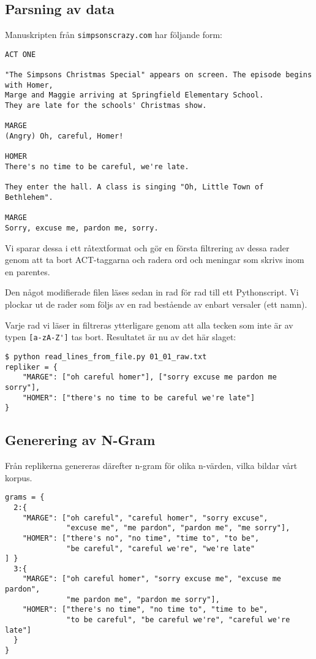\documentclass[a4paper]{article}
\begin{document}
\subsection{Parsning av data}
Manuskripten från \nolinkurl{simpsonscrazy.com} har följande form:
\begin{verbatim}
ACT ONE

"The Simpsons Christmas Special" appears on screen. The episode begins with Homer,
Marge and Maggie arriving at Springfield Elementary School.
They are late for the schools' Christmas show.

MARGE
(Angry) Oh, careful, Homer!

HOMER
There's no time to be careful, we're late.

They enter the hall. A class is singing "Oh, Little Town of Bethlehem".

MARGE
Sorry, excuse me, pardon me, sorry.
\end{verbatim}

Vi sparar dessa i ett råtextformat och gör en första filtrering av
dessa rader genom att ta bort ACT-taggarna och radera ord och meningar
som skrivs inom en parentes.

Den något modifierade filen läses sedan in rad för rad till ett
Pythonscript. Vi plockar ut de rader som följs av en rad bestående av
enbart versaler (ett namn).

Varje rad vi läser in filtreras ytterligare genom att alla tecken som
inte är av typen \verb=[a-zA-Z']= tas bort. Resultatet är nu av det
här slaget:

\begin{verbatim}
$ python read_lines_from_file.py 01_01_raw.txt
repliker = {
    "MARGE": ["oh careful homer"], ["sorry excuse me pardon me sorry"],
    "HOMER": ["there's no time to be careful we're late"]
}
\end{verbatim}

\subsection{Generering av N-Gram}
Från replikerna genereras därefter n-gram för olika n-värden, vilka
bildar vårt korpus.

\begin{verbatim}
grams = {
  2:{
    "MARGE": ["oh careful", "careful homer", "sorry excuse",
              "excuse me", "me pardon", "pardon me", "me sorry"],
    "HOMER": ["there's no", "no time", "time to", "to be",
    		  "be careful", "careful we're", "we're late" 
] }
  3:{
    "MARGE": ["oh careful homer", "sorry excuse me", "excuse me pardon",
              "me pardon me", "pardon me sorry"],
    "HOMER": ["there's no time", "no time to", "time to be",
              "to be careful", "be careful we're", "careful we're late"]
  }
}
\end{verbatim}
\end{document}
